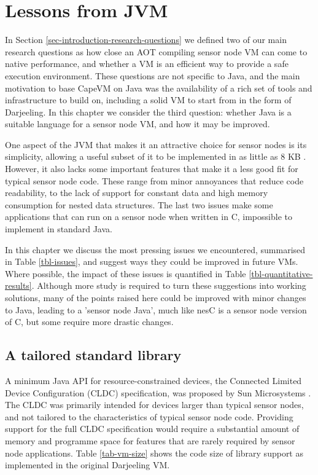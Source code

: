 \chapter{Lessons from JVM}



\label{sec-lessons-from-jvm}

In Section \ref{sec-introduction-research-questions} we defined two of our main research questions as how close an AOT compiling sensor node VM can come to native performance, and whether a VM is an efficient way to provide a safe execution environment. These questions are not specific to Java, and the main motivation to base CapeVM on Java was the availability of a rich set of tools and infrastructure to build on, including a solid VM to start from in the form of Darjeeling. In this chapter we consider the third question: whether Java is a suitable language for a sensor node VM, and how it may be improved.

One aspect of the JVM that makes it an attractive choice for sensor nodes is its simplicity, allowing a useful subset of it to be implemented in as little as 8 KB \cite{Harbaum}. However, it also lacks some important features that make it a less good fit for typical sensor node code. These range from minor annoyances that reduce code readability, to the lack of support for constant data and high memory consumption for nested data structures. The last two issues make some applications that can run on a sensor node when written in C, impossible to implement in standard Java.

In this chapter we discuss the most pressing issues we encountered, summarised in Table \ref{tbl-issues}, and suggest ways they could be improved in future VMs. Where possible, the impact of these issues is quantified in Table \ref{tbl-quantitative-results}. Although more study is required to turn these suggestions into working solutions, many of the points raised here could be improved with minor changes to Java, leading to a 'sensor node Java', much like nesC \cite{Gay:2003up} is a sensor node version of C, but some require more drastic changes.




\section{A tailored standard library}
\label{sec-std-lib}

A minimum Java API for resource-constrained devices, the Connected Limited Device Configuration (CLDC) specification, was proposed by Sun Microsystems \cite{CLDC}. The CLDC was primarily intended for devices larger than typical sensor nodes, and not tailored to the characteristics of typical sensor node code. Providing support for the full CLDC specification would require a substantial amount of memory and programme space for features that are rarely required by sensor node applications. Table \ref{tab-vm-size} shows the code size of library support as implemented in the original Darjeeling VM.

